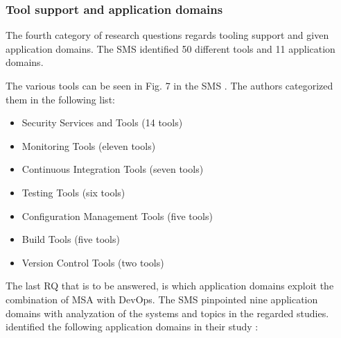 \subsubsection{Tool support and application domains}

The fourth category of research questions regards tooling support
and given application domains. The SMS identified 50 different tools and
11 application domains.

The various tools can be seen in Fig. 7 in the SMS \cite{waseem:SMSMSADevOps}.
The authors categorized them in the following list:

\begin{itemize}
    \item Security Services and Tools (14 tools)
    \item Monitoring Tools (eleven tools)
    \item Continuous Integration Tools (seven tools)
    \item Testing Tools (six tools)
    \item Configuration Management Tools (five tools)
    \item Build Tools (five tools)
    \item Version Control Tools (two tools)
\end{itemize}

The last RQ that is to be answered, is which application domains
exploit the combination of MSA with DevOps. The SMS pinpointed nine
application domains with analyzation of the systems and topics
in the regarded studies. \smsAuthors identified the following
application domains in their study \cite{waseem:SMSMSADevOps}:

